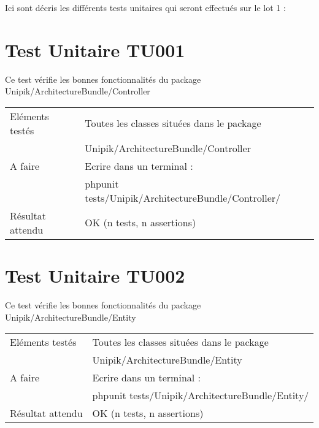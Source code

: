 
Ici sont décris les différents tests unitaires qui seront effectués sur le lot 1 :

\section{Test Unitaire TU001}
	
		Ce test vérifie les bonnes fonctionnalités du package Unipik/ArchitectureBundle/Controller \\
		
		
  		\begin{center}
    	 		\begin{tabular}[h]{|p{}|p{}|}
			\hline
				Eléments testés & Toutes les classes situées dans le package \\ 																& Unipik/ArchitectureBundle/Controller \\\hline
    				A faire & Ecrire dans un terminal : \\ 
    						& phpunit tests/Unipik/ArchitectureBundle/Controller/\\\hline
    				Résultat attendu & OK (n tests, n assertions) \\\hline
     		\end{tabular}
  		\end{center}	
	
\section{Test Unitaire TU002}

		Ce test vérifie les bonnes fonctionnalités du package Unipik/ArchitectureBundle/Entity \\
		
		
  		\begin{center}
    	 		\begin{tabular}[h]{|p{}|p{}|}
			\hline
				Eléments testés & Toutes les classes situées dans le package \\ 																& Unipik/ArchitectureBundle/Entity \\\hline
    				A faire & Ecrire dans un terminal : \\ 
    						& phpunit tests/Unipik/ArchitectureBundle/Entity/\\\hline
    				Résultat attendu & OK (n tests, n assertions) \\\hline
     		\end{tabular}
  		\end{center}	
  		
